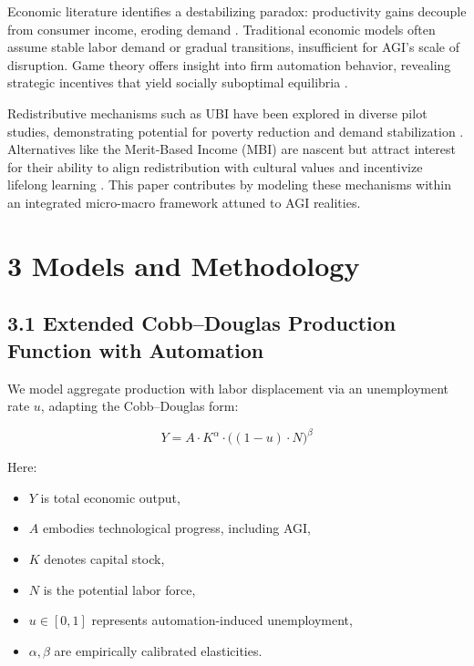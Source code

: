 \documentclass[11pt]{amsart}
\begin{document}
Economic literature identifies a destabilizing paradox: productivity gains decouple from consumer income, eroding demand \cite{MIT2025}. Traditional economic models often assume stable labor demand or gradual transitions, insufficient for AGI’s scale of disruption. Game theory offers insight into firm automation behavior, revealing strategic incentives that yield socially suboptimal equilibria \cite{VendingBench2025}.


Redistributive mechanisms such as UBI have been explored in diverse pilot studies, demonstrating potential for poverty reduction and demand stabilization \cite{MIT2025}. Alternatives like the Merit-Based Income (MBI) are nascent but attract interest for their ability to align redistribution with cultural values and incentivize lifelong learning \cite{CarnegieMellon2025}. This paper contributes by modeling these mechanisms within an integrated micro-macro framework attuned to AGI realities.


\hypertarget{x-3-models-and-methodology}{\section{3 Models and Methodology}}
\hypertarget{x-3.1-extended-cobb–douglas-production-function-with-automation}{\subsection{3.1 Extended Cobb–Douglas Production Function with Automation}}
We model aggregate production with labor displacement via an unemployment rate $u$, adapting the Cobb–Douglas form:


\[
Y = A \cdot K^{\alpha} \cdot \big((1 - u) \cdot N\big)^{\beta}
\]

Here:


\begin{itemize}

\item $Y$ is total economic output,

\item $A$ embodies technological progress, including AGI,

\item $K$ denotes capital stock,

\item $N$ is the potential labor force,

\item $u \in [0,1]$ represents automation-induced unemployment,

\item $\alpha, \beta$ are empirically calibrated elasticities.

\end{itemize}
\end{document}
